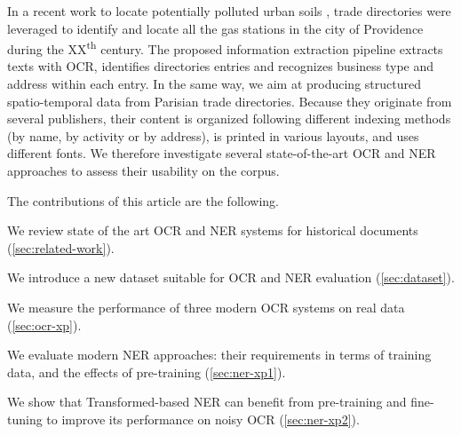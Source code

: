 In a recent work to locate potentially polluted urban soils \cite{bell2020automated}, trade directories were leveraged to identify and locate all the gas stations in the city of Providence during the XX\textsuperscript{th} century.
The proposed information extraction pipeline extracts texts with OCR, identifies directories entries and recognizes business type and address within each entry.
In the same way, we aim at producing structured spatio-temporal data from Parisian trade directories.
Because they originate from several publishers, their content is organized following different indexing methods (by name, by activity or by address), is printed in various layouts, and uses different fonts.
We therefore investigate several state-of-the-art OCR and NER approaches to assess their usability on the corpus.

The contributions of this article are the following.
\begin{enumerate*}[(i)]
    \item We review state of the art OCR and NER systems for historical documents (\cref{sec:related-work}).
    \item We introduce a new dataset suitable for OCR and NER evaluation (\cref{sec:dataset}).
    \item We measure the performance of three modern OCR systems on real data (\cref{sec:ocr-xp}).
    \item We evaluate modern NER approaches: their requirements in terms of training data, and the effects of pre-training (\cref{sec:ner-xp1}).
    \item We show that Transformed-based NER can benefit from pre-training and fine-tuning to improve its performance on noisy OCR (\cref{sec:ner-xp2}).
\end{enumerate*}



